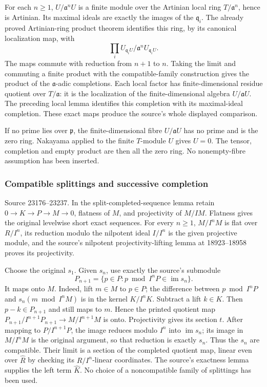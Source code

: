 For each \(n\geq1\), \(U/\mathfrak a^nU\) is a finite module over the Artinian local ring \(T/\mathfrak a^n\), hence is Artinian. Its maximal ideals are exactly the images of the \(\mathfrak q_i\). The already proved Artinian-ring product theorem identifies this ring, by its canonical localization map, with \[
\prod_i U_{\mathfrak q_iU}/\mathfrak a^nU_{\mathfrak q_iU}.
\] The maps commute with reduction from \(n+1\) to \(n\). Taking the limit and commuting a finite product with the compatible-family construction gives the product of the \(\mathfrak a\)-adic completions. Each local factor has finite-dimensional residue quotient over \(T/\mathfrak a\): it is the localization of the finite-dimensional algebra \(U/\mathfrak aU\). The preceding local lemma identifies this completion with its maximal-ideal completion. These exact maps produce the source's whole displayed comparison.

If no prime lies over \(\mathfrak p\), the finite-dimensional fibre \(U/\mathfrak aU\) has no prime and is the zero ring. Nakayama applied to the finite \(T\)-module \(U\) gives \(U=0\). The tensor, completion and empty product are then all the zero ring. No nonempty-fibre assumption has been inserted.

\subsubsection{Compatible splittings and successive completion}\label{algebra-proof-015-compatible-splittings-and-successive-completion}

Source 23176--23237. In the split-completed-sequence lemma retain \(0\to K\to P\to M\to0\), flatness of \(M\), and projectivity of \(M/IM\). Flatness gives the original levelwise short exact sequences. For every \(n\geq1\), \(M/I^nM\) is flat over \(R/I^n\), its reduction modulo the nilpotent ideal \(I/I^n\) is the given projective module, and the source's nilpotent projectivity-lifting lemma at 18923--18958 proves its projectivity.

Choose the original \(s_1\). Given \(s_n\), use exactly the source's submodule \[
P_{n+1}=\{p\in P:p\bmod I^nP\in\operatorname{im}s_n\}.
\] It maps onto \(M\). Indeed, lift \(m\in M\) to \(p\in P\); the difference between \(p\bmod I^nP\) and \(s_n(m\bmod I^nM)\) is in the kernel \(K/I^nK\). Subtract a lift \(k\in K\). Then \(p-k\in P_{n+1}\) and still maps to \(m\). Hence the printed quotient map \(P_{n+1}/I^{n+1}P_{n+1}\to M/I^{n+1}M\) is onto. Projectivity gives its section \(t\). After mapping to \(P/I^{n+1}P\), the image reduces modulo \(I^n\) into \(\operatorname{im}s_n\); its image in \(M/I^nM\) is the original argument, so that reduction is exactly \(s_n\). Thus the \(s_n\) are compatible. Their limit is a section of the completed quotient map, linear even over \(\widehat R\) by checking its \(R/I^n\)-linear coordinates. The source's exactness lemma supplies the left term \(\widehat K\). No choice of a noncompatible family of splittings has been used.

